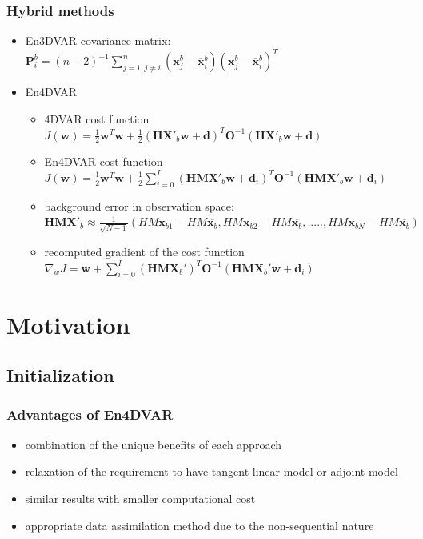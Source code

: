 \documentclass{beamer}
\begin{document}
\begin{frame}
	\frametitle{Hybrid methods}

	\begin{itemize}
		
		\item En3DVAR covariance matrix: $\textbf{P}^{b}_{i} = (n-2)^{-1} \sum_{j=1, j \ne i}^{n}(\textbf{x}_{j}^{b} - \overline{\textbf{x}}_{i}^{b})(\textbf{x}_{j}^{b} - \overline{\textbf{x}}_{i}^{b})^{T}$
		
		\item En4DVAR
		\begin{itemize}
			\item 4DVAR cost function $J(\textbf{w}) = \frac{1}{2} \textbf{w}^{T}\textbf{w} + \frac{1}{2}(\textbf{H}\textbf{X}'_{b}\textbf{w}+\textbf{d})^{T}\textbf{O}^{-1}(\textbf{H}\textbf{X}'_{b}\textbf{w}+\textbf{d})$
			\item En4DVAR cost function $J(\textbf{w}) = \frac{1}{2} \textbf{w}^{T}\textbf{w} + \frac{1}{2}\sum_{i=0}^{I}(\textbf{HM}\textbf{X}'_{b}\textbf{w} + \textbf{d}_{i})^{T}\textbf{O}^{-1}(\textbf{HMX}'_{b}\textbf{w}+\textbf{d}_{i})$
			\item background error in observation space:
			$\textbf{HMX}'_{b} \approx \frac{1}{\sqrt{N-1}}(HM\textbf{x}_{b1}-HM\overline{\textbf{x}_{b}}, HM\textbf{x}_{b2}-HM\overline{\textbf{x}_{b}},.....,HM\textbf{x}_{bN}-HM\overline{\textbf{x}_{b}} )$
			\item recomputed gradient of the cost function $\nabla _{w}J = \textbf{w} + \sum_{i=0}^{I}(\textbf{HMX}_{b}')^{T}\textbf{O}^{-1}(\textbf{HMX}_{b}'\textbf{w}+\textbf{d}_{i})$
		\end{itemize}
		
	\end{itemize}
\end{frame}

\section{Motivation}
\subsection{Initialization}
\begin{frame}
	\frametitle{Advantages of En4DVAR}
	
	\begin{itemize}
		
		\item combination of the unique benefits of each approach 
		\item relaxation of the requirement to have tangent linear model or adjoint model
		\item similar results with smaller computational cost
		\item appropriate data assimilation method due to the non-sequential nature
		
	\end{itemize}
\end{frame}
\end{document}
